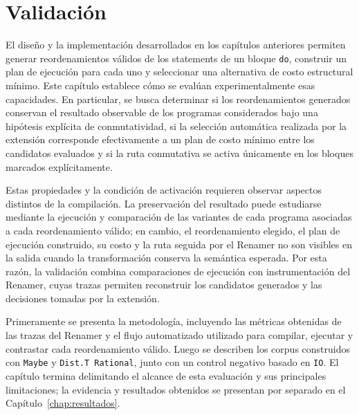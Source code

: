 
\chapter{Validación}
\label{chap:validacion}

El diseño y la implementación desarrollados en los capítulos anteriores permiten generar reordenamientos válidos de los statements de un bloque \texttt{do}, construir un plan de ejecución para cada uno y seleccionar una alternativa de costo estructural mínimo. Este capítulo establece cómo se evalúan experimentalmente esas capacidades. En particular, se busca determinar si los reordenamientos generados conservan el resultado observable de los programas considerados bajo una hipótesis explícita de conmutatividad, si la selección automática realizada por la extensión corresponde efectivamente a un plan de costo mínimo entre los candidatos evaluados y si la ruta conmutativa se activa únicamente en los bloques marcados explícitamente.

Estas propiedades y la condición de activación requieren observar aspectos distintos de la compilación. La preservación del resultado puede estudiarse mediante la ejecución y comparación de las variantes de cada programa asociadas a cada reordenamiento válido; en cambio, el reordenamiento elegido, el plan de ejecución construido, su costo y la ruta seguida por el Renamer no son visibles en la salida cuando la transformación conserva la semántica esperada. Por esta razón, la validación combina comparaciones de ejecución con instrumentación del Renamer, cuyas trazas permiten reconstruir los candidatos generados y las decisiones tomadas por la extensión.

Primeramente se presenta la metodología, incluyendo las métricas obtenidas de las trazas del Renamer y el flujo automatizado utilizado para compilar, ejecutar y contrastar cada reordenamiento válido. Luego se describen los corpus construidos con \texttt{Maybe} y \texttt{Dist.T Rational}, junto con un control negativo basado en \texttt{IO}. El capítulo termina delimitando el alcance de esta evaluación y sus principales limitaciones; la evidencia y resultados obtenidos se presentan por separado en el Capítulo~\ref{chap:resultados}.




